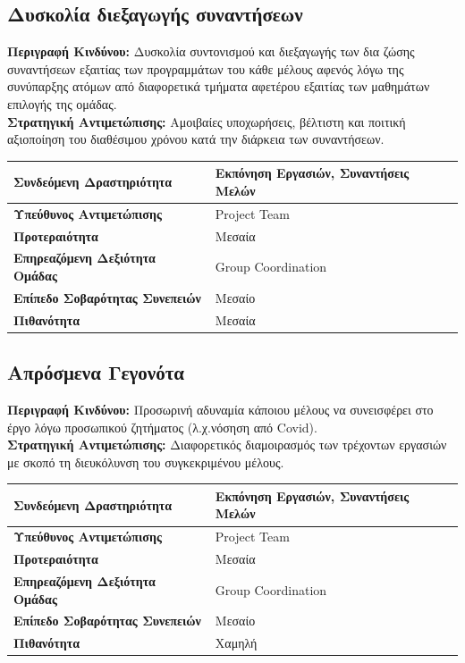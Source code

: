 \documentclass{article}
\newcommand\T{\rule{0pt}{2.6ex}}       %
\newcommand\B{\rule[-1.2ex]{0pt}{0pt}}
\begin{document}
 \subsection{Δυσκολία διεξαγωγής συναντήσεων}
 
 \textbf{Περιγραφή Κινδύνου:} Δυσκολία συντονισμού και διεξαγωγής των δια ζώσης συναντήσεων εξαιτίας των προγραμμάτων του κάθε μέλους αφενός λόγω της συνύπαρξης ατόμων από διαφορετικά τμήματα αφετέρου εξαιτίας των μαθημάτων επιλογής της ομάδας.\\
 
 \textbf{Στρατηγική Αντιμετώπισης:} Αμοιβαίες υποχωρήσεις, βέλτιστη και ποιτική αξιοποίηση του διαθέσιμου χρόνου κατά την διάρκεια των συναντήσεων.
 \begin{center}
     \begin{tabular}{|l|l|}
     \hline
      \textbf{Συνδεόμενη Δραστηριότητα}   & Εκπόνηση Εργασιών, Συναντήσεις Μελών \T\B \\ 
      \hline
      \textbf{Υπεύθυνος Αντιμετώπισης} & Project Team \T\B \\
      \hline
      \textbf{Προτεραιότητα} & Μεσαία \T\B \\
      \hline
      \textbf{Επηρεαζόμενη Δεξιότητα Ομάδας} & Group Coordination \T\B \\
      \hline
      \textbf{Επίπεδο Σοβαρότητας Συνεπειών} & Μεσαίο \T\B \\
      \hline
      \textbf{Πιθανότητα} & Μεσαία \T\B \\
      \hline
     \end{tabular}
 \end{center}
 
 
 \subsection{Απρόσμενα Γεγονότα}
 
\textbf{Περιγραφή Κινδύνου:} Προσωρινή αδυναμία κάποιου μέλους να συνεισφέρει στο έργο λόγω προσωπικού ζητήματος (λ.χ.νόσηση από Covid). \\

\textbf{Στρατηγική Αντιμετώπισης:} Διαφορετικός διαμοιρασμός των τρέχοντων εργασιών με σκοπό τη διευκόλυνση του συγκεκριμένου μέλους.
 
  \begin{center}
     \begin{tabular}{|l|l|}
     \hline
      \textbf{Συνδεόμενη Δραστηριότητα} & Εκπόνηση Εργασιών, Συναντήσεις Μελών \T\B \\ 
      \hline
      \textbf{Υπεύθυνος Αντιμετώπισης} & Project Team \T\B \\
      \hline
      \textbf{Προτεραιότητα} & Μεσαία \T\B \\
      \hline
      \textbf{Επηρεαζόμενη Δεξιότητα Ομάδας} & Group Coordination \T\B \\
      \hline
      \textbf{Επίπεδο Σοβαρότητας Συνεπειών} & Μεσαίο \T\B \\
      \hline
      \textbf{Πιθανότητα} & Χαμηλή \T\B \\
      \hline
     \end{tabular}
 \end{center}
 
\end{document}
